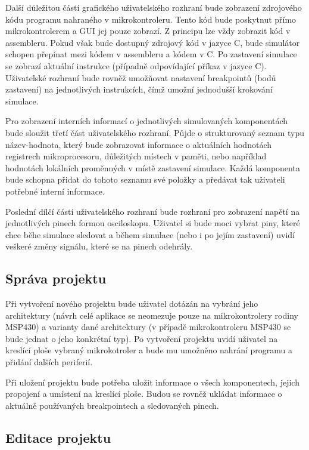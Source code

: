 Další důležitou částí grafického uživatelského rozhraní bude zobrazení zdrojového kódu programu nahraného v mikrokontroleru. Tento kód bude poskytnut
přímo mikrokontrolerem a GUI jej pouze zobrazí. Z principu lze vždy zobrazit kód v assembleru. Pokud však bude dostupný zdrojový kód v jazyce C, bude 
simulátor schopen přepínat mezi kódem v assembleru a kódem v C. Po zastavení simulace se zobrazí aktuální instrukce (případně odpovídající příkaz v jazyce C). Uživatelské rozhraní bude rovněž umožňovat nastavení breakpointů (bodů zastavení) na jednotlivých instrukcích, čímž umožní jednodušší krokování
simulace.

Pro zobrazení interních informací o jednotlivých simulovaných komponentách bude sloužit třetí část uživatelského rozhraní. Půjde o strukturovaný seznam
typu název-hodnota, který bude zobrazovat informace o aktuálních hodnotách registrech mikroprocesoru, důležitých místech v paměti, nebo například hodnotách
lokálních proměnných v místě zastavení simulace. Každá komponenta bude schopna přidat do tohoto seznamu své položky a předávat tak uživateli potřebné
interní informace.

Poslední dílčí částí uživatelského rozhraní bude rozhraní pro zobrazení napětí na jednotlivých pinech formou osciloskopu. Uživatel si bude moci vybrat
piny, které chce běhe simulace sledovat a během simulace (nebo i po jejím zastavení) uvidí veškeré změny signálu, které se na pinech odehrály.

\subsection{Správa projektu}

Při vytvoření nového projektu bude uživatel dotázán na vybrání jeho architektury (návrh celé aplikace se neomezuje pouze na mikrokontrolery rodiny MSP430) a varianty dané architektury (v případě mikrokontroleru MSP430 se bude jednat o jeho konkrétní typ). Po vytvoření projektu uvidí uživatel na kreslící ploše vybraný mikrokotroler a bude mu umožněno nahrání programu a přidání dalších periferií.

Při uložení projektu bude potřeba uložit informace o všech komponentech, jejich propojení a umístení na kreslící ploše. Budou se rovněž ukládat informace
o aktuálně používaných breakpointech a sledovaných pinech.

\subsection{Editace projektu}


